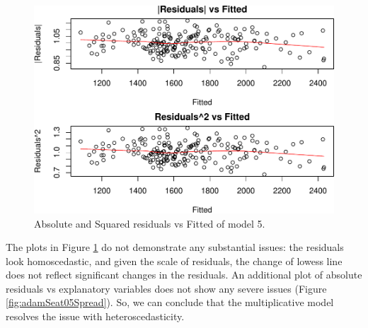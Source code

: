 \documentclass[]{book}
\newenvironment{Shaded}{\begin{snugshade}}{\end{snugshade}}
\newcommand{\DataTypeTok}[1]{\textcolor[rgb]{0.13,0.29,0.53}{#1}}
\newcommand{\DecValTok}[1]{\textcolor[rgb]{0.00,0.00,0.81}{#1}}
\newcommand{\KeywordTok}[1]{\textcolor[rgb]{0.13,0.29,0.53}{\textbf{#1}}}
\newcommand{\NormalTok}[1]{#1}
\newcommand{\OperatorTok}[1]{\textcolor[rgb]{0.81,0.36,0.00}{\textbf{#1}}}
\newcommand{\OtherTok}[1]{\textcolor[rgb]{0.56,0.35,0.01}{#1}}
\theoremstyle{definition}
\theoremstyle{definition}
\theoremstyle{definition}
\theoremstyle{definition}
\theoremstyle{remark}
\begin{document}
\begin{figure}
\centering
\includegraphics{Svetunkov--2022----ADAM_files/figure-latex/adamSeat05HeteroPlot-1.pdf}
\caption{\label{fig:adamSeat05HeteroPlot}Absolute and Squared residuals vs Fitted of model 5.}
\end{figure}

The plots in Figure \ref{fig:adamSeat05HeteroPlot} do not demonstrate any substantial issues: the residuals look homoscedastic, and given the scale of residuals, the change of lowess line does not reflect significant changes in the residuals. An additional plot of absolute residuals vs explanatory variables does not show any severe issues (Figure \ref{fig:adamSeat05Spread}). So, we can conclude that the multiplicative model resolves the issue with heteroscedasticity.

\begin{Shaded}
\end{Shaded}
\end{document}
